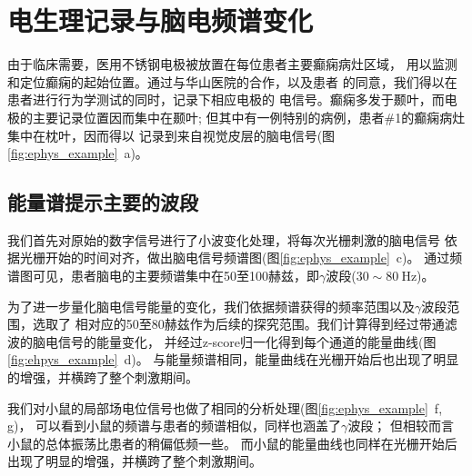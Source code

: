 
\section{电生理记录与脑电频谱变化}
由于临床需要，医用不锈钢电极被放置在每位患者主要癫痫病灶区域，
用以监测和定位癫痫的起始位置。通过与华山医院的合作，以及患者
的同意，我们得以在患者进行行为学测试的同时，记录下相应电极的
电信号。癫痫多发于颞叶，而电极的主要记录位置因而集中在颞叶;
但其中有一例特别的病例，患者\#1的癫痫病灶集中在枕叶，因而得以
记录到来自视觉皮层的脑电信号(图\ref{fig:ephys_example}~a)。

\subsection{能量谱提示主要的波段}
我们首先对原始的数字信号进行了小波变化处理，将每次光栅刺激的脑电信号
依据光栅开始的时间对齐，做出脑电信号频谱图(图\ref{fig:ephys_example}~c)。
通过频谱图可见，患者脑电的主要频谱集中在50至100赫兹，即\(\gamma\)波段(\(30 \sim 80\ \text{Hz}\))。

为了进一步量化脑电信号能量的变化，我们依据频谱获得的频率范围以及\(\gamma\)波段范围，选取了
相对应的50至80赫兹作为后续的探究范围。我们计算得到经过带通滤波的脑电信号的能量变化，
并经过z-score归一化得到每个通道的能量曲线(图\ref{fig:ehpys_example}~d)。
与能量频谱相同，能量曲线在光栅开始后也出现了明显的增强，并横跨了整个刺激期间。

我们对小鼠的局部场电位信号也做了相同的分析处理(图\ref{fig:ephys_example}~f, g)，
可以看到小鼠的频谱与患者的频谱相似，同样也涵盖了\(\gamma\)波段；
但相较而言小鼠的总体振荡比患者的稍偏低频一些。
而小鼠的能量曲线也同样在光栅开始后出现了明显的增强，并横跨了整个刺激期间。

